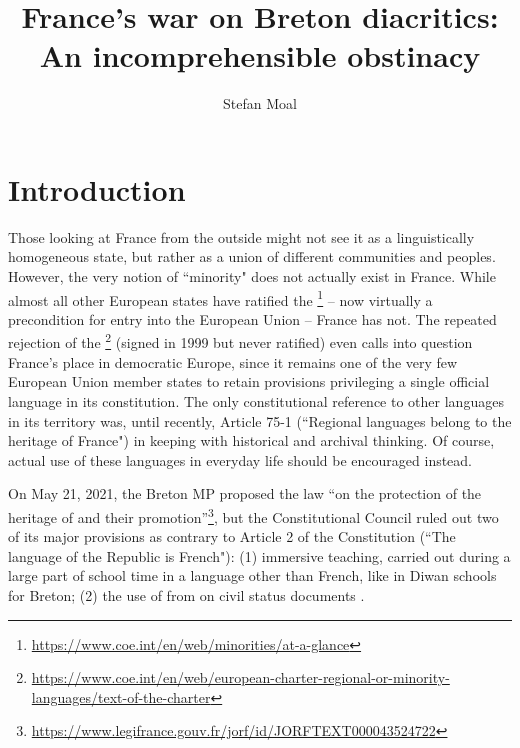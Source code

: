 \documentclass[output=paper,colorlinks,citecolor=brown]{langscibook}
\author{Stefan Moal\orcid{}\affiliation{Université Rennes 2}}
\title{France’s war on Breton diacritics: An incomprehensible obstinacy}
\begin{document}
\maketitle 







\section{Introduction}

Those looking at France from the outside might not see it as a linguistically homogeneous state, but rather as a union of different communities and peoples. However, the very notion of ``minority" does not actually exist in France. While almost all other European states have ratified the \footnote{\url{https://www.coe.int/en/web/minorities/at-a-glance}} – now virtually a precondition for entry into the European Union – France has not. The repeated rejection of the \footnote{\url{https://www.coe.int/en/web/european-charter-regional-or-minority-languages/text-of-the-charter}} (signed in 1999 but never ratified) even calls into question France's place in democratic Europe, since it remains one of the very few European Union member states to retain provisions privileging a single official language in its constitution. The only constitutional reference to other languages in its territory was, until recently, Article 75-1 (``Regional languages belong to the heritage of France") in keeping with historical and archival thinking. Of course, actual use of these languages in everyday life should be encouraged instead. 

On May 21, 2021, the Breton MP  proposed the law ``on the protection of the heritage of  and their promotion”\footnote{\url{https://www.legifrance.gouv.fr/jorf/id/JORFTEXT000043524722}}, but the Constitutional Council ruled out two of its major provisions as contrary to Article 2 of the Constitution (``The language of the Republic is French"): (1) immersive teaching, carried out during a large part of school time in a language other than French, like in Diwan schools for Breton; (2) the use of  from  on civil status documents \citep{sm:ConseilConstitutionnel2021}. 
\end{document}
